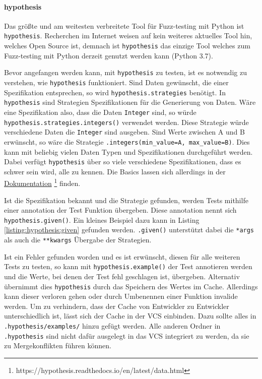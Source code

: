 \paragraph{hypothesis}\label{python-tools:hypothesis}\mbox{}
\newline
Das größte und am weitesten verbreitete Tool für Fuzz-testing mit Python ist
\lstinline{hypothesis}. Recherchen im Internet weisen auf kein weiteres 
aktuelles Tool hin, welches Open Source ist, demnach ist \lstinline{hypothesis} 
das einzige Tool welches zum Fuzz-testing mit Python derzeit genutzt werden 
kann (Python 3.7).

Bevor angefangen werden kann, mit \lstinline{hypothesis} zu testen, ist es
notwendig zu verstehen, wie \lstinline{hypothesis} funktioniert. Sind Daten
gewünscht, die einer Spezifikation entsprechen, so wird
\lstinline{hypothesis.strategies} benötigt. In \lstinline{hypothesis} sind
Strategien Spezifikationen für die Generierung von Daten. Wäre eine
Spezifikation also, dass die Daten \lstinline{Integer} sind, so würde
\lstinline{hypothesis.strategies.integers()} verwendet werden. Diese
Strategie würde verschiedene Daten die \lstinline{Integer} sind ausgeben.
Sind Werte zwischen A und B erwünscht, so wäre die Strategie 
\lstinline{.integers(min_value=A, max_value=B)}. Dies kann mit beliebig
vielen Daten Typen und Spezifikationen durchgeführt werden. Dabei verfügt 
\lstinline{hypothesis} über so viele verschiedene Spezifikationen, dass es 
schwer sein wird, alle zu kennen. Die Basics lassen sich allerdings in der
\href{https://hypothesis.readthedocs.io/en/latest/data.html}{Dokumentation}
\footnote{https://hypothesis.readthedocs.io/en/latest/data.html} finden.

Ist die Spezifikation bekannt und die Strategie gefunden, werden Tests mithilfe
einer \Gls{annotation} der Test Funktion übergeben. Diese \Gls{annotation}
nennt sich \lstinline{hypothesis.given()}. Ein kleines Beispiel dazu kann in
Listing \ref{listing:hypothesis:given} gefunden werden. \lstinline{.given()}
unterstützt dabei die \lstinline{*args} als auch die \lstinline{**kwargs}
Übergabe der Strategien.

Ist ein Fehler gefunden worden und es ist erwünscht, diesen für alle weiteren
Tests zu testen, so kann mit \lstinline{hypothesis.example()} der Test
annotieren werden und die Werte, bei denen der Test fehl geschlagen ist,
übergeben. Alternativ  übernimmt dies \lstinline{hypothesis} durch das
Speichern des Wertes im Cache. Allerdings kann dieser verloren gehen oder durch
Umbenennen einer Funktion invalide werden. Um zu verhindern, dass der Cache von
Entwickler zu Entwickler unterschiedlich ist, lässt sich der Cache in der VCS
einbinden. Dazu sollte alles in \lstinline{.hypothesis/examples/} hinzu gefügt
werden. Alle anderen Ordner in \lstinline{.hypothesis} sind nicht dafür
ausgelegt in das VCS integriert zu werden, da sie zu Mergekonflikten führen
können.

